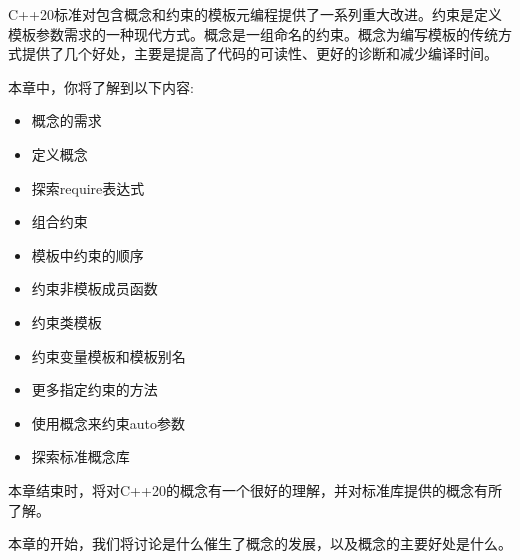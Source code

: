 C++20标准对包含概念和约束的模板元编程提供了一系列重大改进。约束是定义模板参数需求的一种现代方式。概念是一组命名的约束。概念为编写模板的传统方式提供了几个好处，主要是提高了代码的可读性、更好的诊断和减少编译时间。

本章中，你将了解到以下内容:

\begin{itemize}
\item
概念的需求

\item
定义概念

\item
探索require表达式

\item
组合约束

\item
模板中约束的顺序

\item
约束非模板成员函数

\item
约束类模板

\item
约束变量模板和模板别名

\item
更多指定约束的方法

\item
使用概念来约束auto参数

\item
探索标准概念库
\end{itemize}

本章结束时，将对C++20的概念有一个很好的理解，并对标准库提供的概念有所了解。

本章的开始，我们将讨论是什么催生了概念的发展，以及概念的主要好处是什么。


























